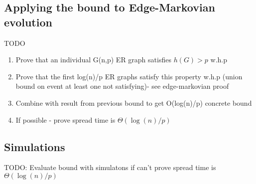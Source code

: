 \subsection{Applying the bound to Edge-Markovian evolution}

TODO
\begin{enumerate}
	\item Prove that an individual G(n,p) ER graph satisfies $h(G) > p$ w.h.p
	\item Prove that the first log(n)/p ER graphs satisfy this property w.h.p (union bound on event at least one not satisfying)- see edge-markovian proof
	\item Combine with result from previous bound to get O(log(n)/p) concrete bound
	\item If possible - prove spread time is $\Theta(\log(n)/p)$
\end{enumerate}

\subsection{Simulations}

TODO: Evaluate bound with simulatons if can't prove spread time is  $\Theta(\log(n)/p)$